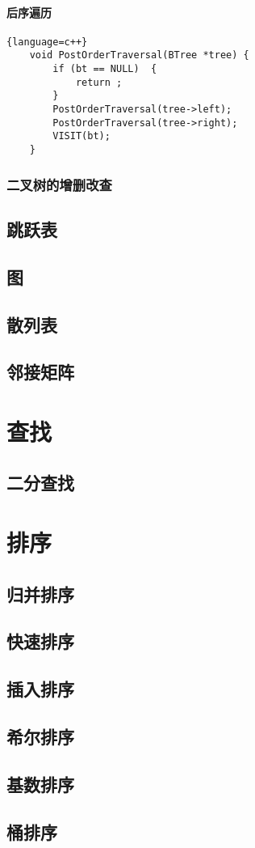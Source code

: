 \paragraph{后序遍历}
\begin{lstlisting}{language=c++}
	void PostOrderTraversal(BTree *tree) {
		if (bt == NULL)  {
			return ; 
		}
		PostOrderTraversal(tree->left); 
		PostOrderTraversal(tree->right); 
		VISIT(bt);
	}
\end{lstlisting}
\subsubsection{二叉树的增删改查}

\subsection{跳跃表}
\subsection{图}
\subsection{散列表}
\subsection{邻接矩阵}

\section{查找}
\subsection{二分查找}
\section{排序}
\subsection{归并排序}
\subsection{快速排序}
\subsection{插入排序}
\subsection{希尔排序}
\subsection{基数排序}
\subsection{桶排序}

